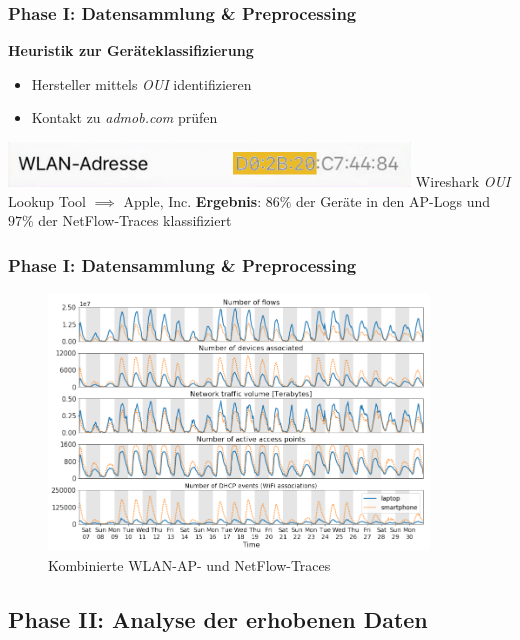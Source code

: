 \documentclass{beamer}
\begin{document}
\begin{frame}
  \frametitle{Phase I: Datensammlung \& Preprocessing}
  \textbf{Heuristik zur Geräteklassifizierung}
  \begin{itemize}
    \item Hersteller mittels \textit{OUI} identifizieren
    \item Kontakt zu \textit{admob.com} prüfen
  \end{itemize}
  \includegraphics[width=0.8\textwidth]{images/MAC_iPhone.png}\newline
  Wireshark \textit{OUI} Lookup Tool $\implies$ Apple, Inc.\newline\newline
  \textbf{Ergebnis}: $86\%$ der Geräte in den AP-Logs und $97\%$ der NetFlow-Traces klassifiziert
\end{frame}

\begin{frame}
  \frametitle{Phase I: Datensammlung \& Preprocessing}
  \begin{figure}
    \centering
    \includegraphics[width=0.9\textwidth]{images/traces.png}
    \caption*{Kombinierte WLAN-AP- und NetFlow-Traces}
  \end{figure}  
\end{frame}

\subsection{\textbf{Phase II}: Analyse der erhobenen Daten}
\end{document}
